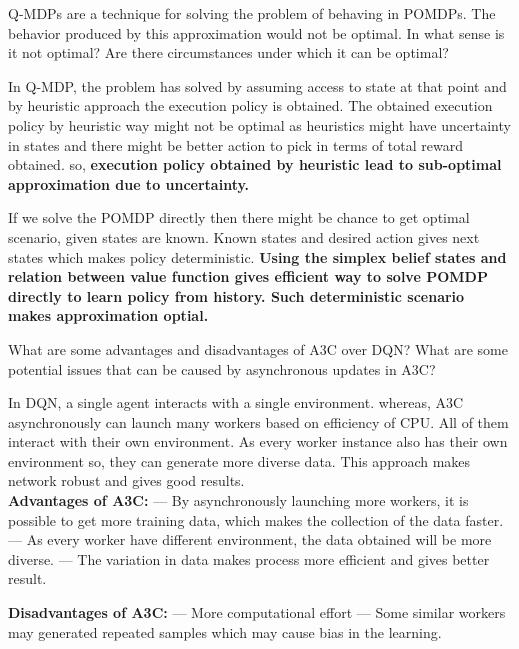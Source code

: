 \documentclass[solution,addpoints,12pt]{exam}
\begin{document}
\begin{questions}
\begin{solution}
\end{solution}


\question[3]
Q-MDPs are a technique for solving the problem of behaving in POMDPs. The behavior produced by this approximation would not be optimal. In what sense is it not optimal?  Are there circumstances under which it can be optimal?

\begin{solution}
	In Q-MDP, the problem has solved by assuming access to state at that point and by heuristic approach the execution policy is obtained. The obtained execution policy by heuristic way might not be optimal as heuristics might have uncertainty in states and there might be better action to pick in terms of total reward obtained. so,\textbf{ execution policy obtained by heuristic lead to sub-optimal approximation due to uncertainty.}
	
	If we solve the POMDP directly then there might be  chance to get optimal scenario, given states are known. Known states and desired action gives next states which makes policy deterministic. \textbf{Using the simplex belief states and relation between value function gives efficient way to solve POMDP directly to learn policy from history. Such deterministic scenario makes approximation optial.}
\end{solution}

\question[3] What are some advantages and disadvantages of A3C over DQN? What are some potential issues that can be caused by asynchronous updates in A3C?

\begin{solution}
In DQN, a single agent interacts with a single environment. whereas, A3C asynchronously can launch many workers  based on efficiency of CPU. All of them interact with their own environment. As every worker instance also has their own environment so, they can generate more diverse data. This approach makes network robust and gives good results.\\

\textbf{Advantages of A3C:}
 \subitem --- By asynchronously launching more workers, it is possible to get more training data, which makes the collection of the data faster.
 \subitem --- As every worker have different environment, the data obtained will be more diverse. 
 \subitem --- The variation in data makes process more efficient and gives better result. 
 
 \textbf{Disadvantages of A3C:}
 \subitem --- More computational effort 
 \subitem --- Some similar workers may generated repeated samples which may cause bias in the learning.
 

\end{solution}
\end{questions}
\end{document}
